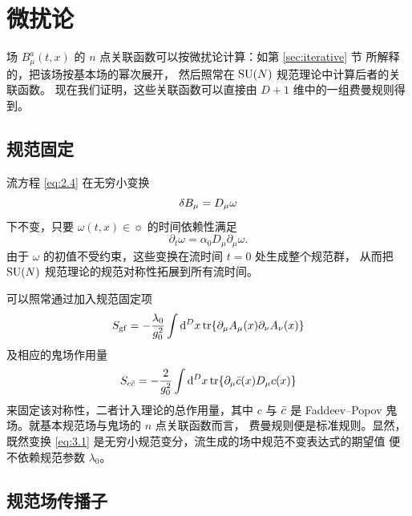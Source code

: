 \section{微扰论}\label{sec:perturbation}

场 $B^a_{\mu}(t,x)$ 的 $n$ 点关联函数可以按微扰论计算：如第 \ref{sec:iterative} 节
所解释的，把该场按基本场的幂次展开，
然后照常在 $\mathrm{SU}(N)$ 规范理论中计算后者的关联函数。
现在我们证明，这些关联函数可以直接由 $D+1$ 维中的一组费曼规则得到。

\subsection{规范固定}\label{ssec:gaugefixing}

流方程 \eqref{eq:2.4} 在无穷小变换
\begin{equation}
  \delta B_{\mu}=D_{\mu}\omega
  \label{eq:3.1}
\end{equation}
下不变，只要 $\omega(t,x)\in\sun$ 的时间依赖性满足
\begin{equation}
  \partial_t\omega=\alpha_0D_{\mu}\partial_{\mu}\omega.
  \label{eq:3.2}
\end{equation}
由于 $\omega$ 的初值不受约束，这些变换在流时间 $t=0$ 处生成整个规范群，
从而把 $\mathrm{SU}(N)$ 规范理论的规范对称性拓展到所有流时间。

可以照常通过加入规范固定项
\begin{equation}
  S_{\mathrm{gf}}=-{\lambda_0\over g_0^2}\int\mathrm{d}^Dx\,
  \mathrm{tr}\{\partial_{\mu}A_{\mu}(x)\partial_{\nu}A_{\nu}(x)\}
  \label{eq:3.3}
\end{equation}
及相应的鬼场作用量
\begin{equation}
  S_{c\bar{c}}=-{2\over g_0^2}\int\mathrm{d}^Dx\,
  \mathrm{tr}\{\partial_{\mu}\bar{c}(x)D_{\mu}c(x)\}
  \label{eq:3.4}
\end{equation}
来固定该对称性，二者计入理论的总作用量，其中 $c$ 与 $\bar{c}$
是 Faddeev--Popov 鬼场。就基本规范场与鬼场的 $n$ 点关联函数而言，
费曼规则便是标准规则。显然，既然变换 \eqref{eq:3.1}
是无穷小规范变分，流生成的场中规范不变表达式的期望值
便不依赖规范参数 $\lambda_0$。

\subsection{规范场传播子}

